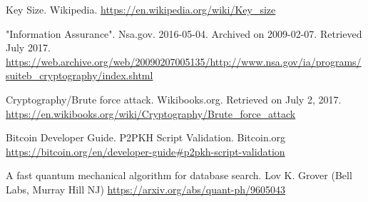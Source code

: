 \documentclass[11pt]{article}
\begin{document}
\begin{thebibliography}{7}
Key Size. Wikipedia.
\url{https://en.wikipedia.org/wiki/Key_size}

"Information Assurance". Nsa.gov. 2016-05-04. Archived on 2009-02-07. Retrieved July 2017.
\url{https://web.archive.org/web/20090207005135/http://www.nsa.gov/ia/programs/suiteb_cryptography/index.shtml}

Cryptography/Brute force attack. Wikibooks.org. Retrieved on July 2, 2017.
\url{https://en.wikibooks.org/wiki/Cryptography/Brute_force_attack}

Bitcoin Developer Guide. P2PKH Script Validation. Bitcoin.org
\url{https://bitcoin.org/en/developer-guide#p2pkh-script-validation}

A fast quantum mechanical algorithm for database search. Lov K. Grover (Bell Labs, Murray Hill NJ)
\url{https://arxiv.org/abs/quant-ph/9605043}

\end{thebibliography}
\end{document}
